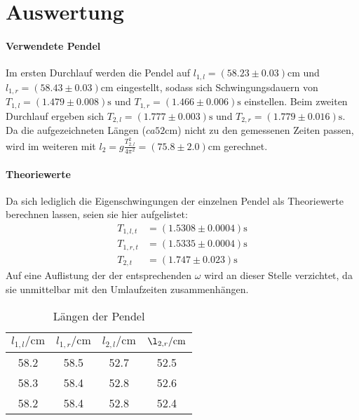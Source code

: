 \section{Auswertung}
\label{sec:Auswertung}

\paragraph{Verwendete Pendel}
Im ersten Durchlauf werden die Pendel auf $l_{1,l} =(58.23 \pm 0.03)\si{\centi\meter}$ und $l_{1,r} =(58.43 \pm 0.03)\si{\centi\meter}$ eingestellt, sodass sich Schwingungsdauern von $T_{1,l} =(1.479 \pm 0.008)\si{\second}$ und $T_{1,r} = (1.466 \pm 0.006)\si{\second}$ einstellen.
Beim zweiten Durchlauf ergeben sich $T_{2,l}=(1.777 \pm 0.003)\si{\second}$ und $T_{2,r} = (1.779 \pm 0.016)\si{\second}$. Da die aufgezeichneten Längen ($ca 52\si{\centi \meter}$) nicht zu den gemessenen Zeiten passen, wird im weiteren mit $l_2 = g \frac{T_{2,l}^2}{4\pi ^2} = (75.8 \pm 2.0) \si{\centi \meter}$ gerechnet.

\paragraph{Theoriewerte}
Da sich lediglich die Eigenschwingungen der einzelnen Pendel als Theoriewerte berechnen lassen, seien sie hier aufgelistet:
\begin{align*}
  T_{1,l,t} &= (1.5308 \pm 0.0004) \si{\second}   \\
  T_{1,r,t} &=  (1.5335 \pm 0.0004) \si{\second}  \\
  T_{2,t} &= (1.747 \pm 0.023) \si{\second}
\end{align*}
Auf eine Auflistung der der entsprechenden $\omega$ wird an dieser Stelle verzichtet, da sie unmittelbar mit den Umlaufzeiten zusammenhängen.

\begin{table}
  \caption{Längen der Pendel}
  \label{tab:l}
  \begin{tabular}{S S S S}
    \toprule
    {$l_{1,l}/\si{\centi\meter}$} & {$l_{1,r}/\si{\centi \meter}$} & {$l_{2,l} /\si{\centi \meter}$} & {$\l_{2,r}/\si{\centi \meter}$}\\
                              &  58.5                         & 52.7                           & 52.5 \\
    58.3                          &  58.4                         & 52.8                           & 52.6 \\
    58.2                          &  58.4                         & 52.8                           & 52.4 \\
    \bottomrule
  \end{tabular}
\end{table}

